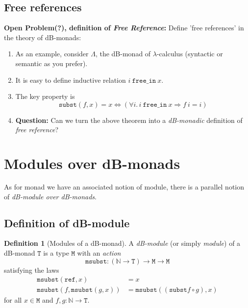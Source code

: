\documentclass[a4paper,twoside,12pt]{article}
\theoremstyle{definition}
\newtheorem{definition}{Definition}
\theoremstyle{remark}
\newcommand{\NN}{\mathbb{N}}
\newcommand{\subst}{\mathtt{subst}}
\newcommand{\refe}{\mathtt{ref}}
\newcommand{\TT}{\mathtt{T}}
\newcommand{\MM}{\mathtt{M}}
\newcommand{\msubst}{\mathtt{msubst}}
\begin{document}
\subsection{Free references}
\label{sec:free-references}

\textbf{Open Problem(?), definition of \emph{Free Reference}:}
Define 'free references' in the theory of dB-monads:
\begin{enumerate}
\item As an example, consider $\Lambda$, the dB-monad of
  $\lambda$-calculus (syntactic or semantic as you prefer).
\item It is easy to define inductive relation
  $i\ \mathtt{free\_in}\ x$.
\item The key property is
  \begin{equation*}
    \subst(f,x) = x \Longleftrightarrow
    (\forall i.\, i\ \mathtt{free\_in}\ x \Longrightarrow f\ i = i)
  \end{equation*}
\item \textbf{Question:} Can we turn the above theorem into a
  \emph{dB-monadic} definition of \emph{free reference}?
\end{enumerate}

\section{Modules over dB-monads}
\label{sec:modules}

As for monad we have an associated notion of module, there is a
parallel notion of \emph{dB-module over dB-monads}.

\subsection{Definition of dB-module}
\label{sec:definition-module}

\begin{definition}[Modules of a dB-monad]
  A \emph{dB-module} (or simply \emph{module}) of a dB-monad $\TT$ is
  a type $\MM$ with an \emph{action}
  \begin{equation*}
    \msubst\colon (\NN\to \TT) \to \MM \to \MM
  \end{equation*}
  satisfying the laws
  \begin{align*}
    \msubst(\refe,x) &= x\\
    \msubst(f,\msubst(g,x)) &= \msubst((\subst f \circ g), x)
  \end{align*}
  for all $x\in \MM$ and $f,g\colon \NN \to \TT$.
\end{definition}
\end{document}
